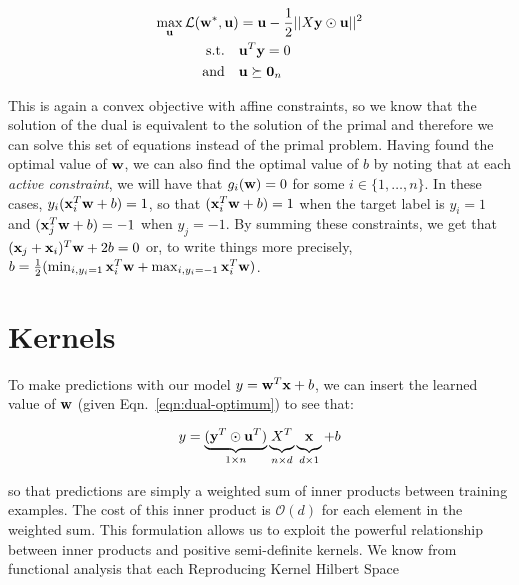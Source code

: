 \begin{align}
\max_{\mathbf{u}} \mathcal{L}(\mathbf{w}^*, \mathbf{u}) &=   \mathbf{u} - \frac{1}{2} || X\mathbf{y} \odot \mathbf{u}||^2 \\
\text{s.t.} \quad & \mathbf{u}^T \mathbf{y} = 0 \\
\text{and} \quad & \mathbf{u} \succeq \mathbf{0}_n
\end{align}

This is again a convex objective with affine constraints, so we know that the solution of the dual is equivalent to the solution of the primal and therefore we can solve this set of equations instead of the primal problem.  Having found the optimal value of $\mathbf{w}$, we can also find the optimal value of $b$ by noting that at each \textit{active constraint}, we will have that $g_i(\mathbf{w}) = 0$ for some $i \in \{1, \dots, n\}$. In these cases, $y_i (\mathbf{x}_i^T \mathbf{w} + b) = 1$, so that $(\mathbf{x}_i^T \mathbf{w} + b) = 1$ when the target label is $y_i = 1$ and $(\mathbf{x}_j^T \mathbf{w} + b) = -1$ when $y_j = -1$. By summing these constraints, we get that $(\mathbf{x}_j + \mathbf{x}_i)^T \mathbf{w} + 2b = 0$ or, to write things more precisely, $b = \frac{1}{2}(\min_{i, y_i = 1} \mathbf{x}_i^T\mathbf{w} + \max_{i, y_i = -1} \mathbf{x}_i^T\mathbf{w})$.

\section*{Kernels}

To make predictions with our model $y = \mathbf{w}^T\mathbf{x} + b$, we can insert the learned value of $\mathbf{w}$ (given Eqn.~\ref{eqn:dual-optimum}) to see that:

\begin{align}
y = \underbrace{(\mathbf{y}^T \odot \mathbf{u}^T)}_{1 \times n} \underbrace{\vphantom{(} X^T}_{n \times d} \underbrace{\vphantom{(} \mathbf{x}}_{d \times 1} + b
\end{align}

so that predictions are simply a weighted sum of inner products between training examples.  The cost of this inner product is $\mathcal{O}(d)$ for each element in the weighted sum. This formulation allows us to exploit the powerful relationship between inner products and positive semi-definite kernels. We know from functional analysis that each Reproducing Kernel Hilbert Space







